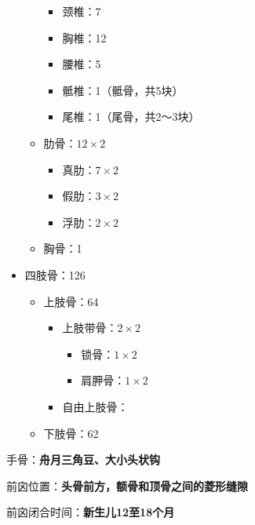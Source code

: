 \begin{notation}
\begin{itemize}
\begin{itemize}
\begin{itemize}
                        \item 颈椎：7
                        \item 胸椎：12
                        \item 腰椎：5
                        \item 骶椎：1（骶骨，共5块）
                        \item 尾椎：1（尾骨，共2～3块）
                    \end{itemize}
                \item 肋骨：$12\times 2$
                    \begin{itemize}
                        \item 真肋：$7\times 2$
                        \item 假肋：$3\times 2$
                        \item 浮肋：$2\times 2$
                    \end{itemize}
                \item 胸骨：1
            \end{itemize}
        \item 四肢骨：126
            \begin{itemize}
                \item 上肢骨：64
                    \begin{itemize}
                        \item 上肢带骨：$2\times 2$
                            \begin{itemize}
                                \item 锁骨：$1\times 2$
                                \item 肩胛骨：$1\times 2$
                            \end{itemize}
                        \item 自由上肢骨：
                    \end{itemize}
                \item 下肢骨：62
            \end{itemize}
    \end{itemize}
\end{notation}
\begin{notation}
    手骨：\textbf{舟月三角豆、大小头状钩}
\end{notation}
\begin{notation}
    前囟位置：\textbf{头骨前方，额骨和顶骨之间的菱形缝隙}

    前囟闭合时间：\textbf{新生儿12至18个月}
\end{notation}
